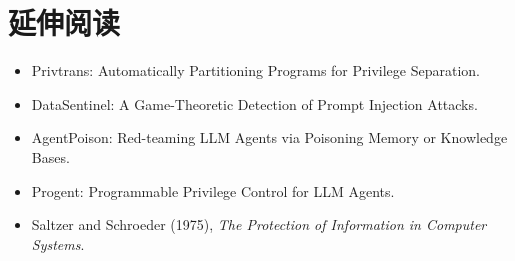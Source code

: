 \documentclass[a4paper]{article}
\begin{document}
\section{延伸阅读}

\begin{itemize}
\item Privtrans: Automatically Partitioning Programs for Privilege Separation.
\item DataSentinel: A Game-Theoretic Detection of Prompt Injection Attacks.
\item AgentPoison: Red-teaming LLM Agents via Poisoning Memory or Knowledge Bases.
\item Progent: Programmable Privilege Control for LLM Agents.
\item Saltzer and Schroeder (1975), \emph{The Protection of Information in Computer Systems}.
\end{itemize}
\end{document}
